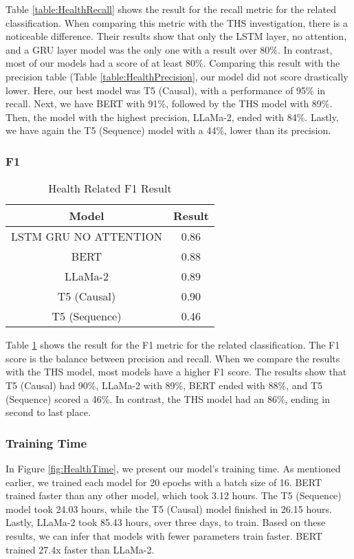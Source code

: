 Table \ref{table:HealthRecall} shows the result for the recall metric for the related classification. When comparing this metric with the THS investigation, there is a noticeable difference. Their results
show that only the LSTM layer, no attention, and a GRU layer model was the only one with a result over 80\%. In contrast, most of our models had a score of at least 80\%. Comparing this result
with the precision table (Table \ref{table:HealthPrecision}, our model did not score drastically lower. Here, our best model was T5 (Causal), with a performance of 95\% in recall. Next, we have
BERT with 91\%, followed by the THS model with 89\%. Then, the model with the highest precision, LLaMa-2, ended with 84\%. Lastly, we have again the T5 (Sequence) model with a 44\%,
lower than its precision.

\subsubsection{F1}
\begin{table}[H]
	\centering
	\caption{Health Related F1 Result}
	\begin{tabular}{||c | c||} 
		\hline
		\textbf{Model} & \textbf{Result} \\ [0.5ex] 
		\hline
		LSTM GRU NO ATTENTION & 0.86  \\
		\hline
		BERT & 0.88  \\
		\hline
		LLaMa-2 & 0.89 \\ 
		\hline
		T5 (Causal) & 0.90 \\
		\hline
		T5 (Sequence) & 0.46 \\
		\hline
	\end{tabular}
	\label{table:HealthF1}
\end{table}

Table \ref{table:HealthF1} shows the result for the F1 metric for the related classification. The F1 score is the balance between precision and recall. When we compare the results with the
THS model, most models have a higher F1 score. The results show that T5 (Causal) had 90\%, LLaMa-2 with 89\%, BERT ended with 88\%, and T5 (Sequence) scored a 46\%. In contrast,
the THS model had an 86\%, ending in second to last place.

\subsubsection{Training Time}

In Figure \ref{fig:HealthTime}, we present our model's training time. As mentioned earlier, we trained each model for 20 epochs with a batch size of 16. BERT trained faster than
any other model, which took 3.12 hours. The T5 (Sequence) model took 24.03 hours, while the T5 (Causal) model finished in 26.15 hours. Lastly, LLaMa-2 took 85.43 hours, over three days, to
train. Based on these results, we can infer that models with fewer parameters train faster. BERT trained 27.4x faster than LLaMa-2.

